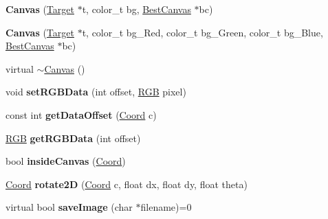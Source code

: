 \begin{DoxyCompactItemize}
\item 
\hypertarget{class_canvas_a53b246273af5f8312e98963ebc5f18c8}{{\bfseries Canvas} (\hyperlink{class_target}{Target} $\ast$t, color\-\_\-t bg, \hyperlink{class_best_canvas}{Best\-Canvas} $\ast$bc)}\label{class_canvas_a53b246273af5f8312e98963ebc5f18c8}

\item 
\hypertarget{class_canvas_ae3d42b2fc30548f6c6bf7d269067e9c7}{{\bfseries Canvas} (\hyperlink{class_target}{Target} $\ast$t, color\-\_\-t bg\-\_\-\-Red, color\-\_\-t bg\-\_\-\-Green, color\-\_\-t bg\-\_\-\-Blue, \hyperlink{class_best_canvas}{Best\-Canvas} $\ast$bc)}\label{class_canvas_ae3d42b2fc30548f6c6bf7d269067e9c7}

\item 
virtual \hyperlink{class_canvas_a237c4549ad2e27c729cd1f71e89f0fd9}{$\sim$\-Canvas} ()
\item 
\hypertarget{class_canvas_aa6fd94baa21ffded183b4bf2375d9516}{void {\bfseries set\-R\-G\-B\-Data} (int offset, \hyperlink{struct_r_g_b}{R\-G\-B} pixel)}\label{class_canvas_aa6fd94baa21ffded183b4bf2375d9516}

\item 
\hypertarget{class_canvas_a9b47997839f63bda394c7385eac6f96e}{const int {\bfseries get\-Data\-Offset} (\hyperlink{struct_coord}{Coord} c)}\label{class_canvas_a9b47997839f63bda394c7385eac6f96e}

\item 
\hypertarget{class_canvas_ab1686ad837e67a4c93d7539d0d3d0151}{\hyperlink{struct_r_g_b}{R\-G\-B} {\bfseries get\-R\-G\-B\-Data} (int offset)}\label{class_canvas_ab1686ad837e67a4c93d7539d0d3d0151}

\item 
\hypertarget{class_canvas_a9e51f90be565cb3e5d683cdf83d67956}{bool {\bfseries inside\-Canvas} (\hyperlink{struct_coord}{Coord})}\label{class_canvas_a9e51f90be565cb3e5d683cdf83d67956}

\item 
\hypertarget{class_canvas_ae397083afa0345eec9c0e212903a6394}{\hyperlink{struct_coord}{Coord} {\bfseries rotate2\-D} (\hyperlink{struct_coord}{Coord} c, float dx, float dy, float theta)}\label{class_canvas_ae397083afa0345eec9c0e212903a6394}

\item 
\hypertarget{class_canvas_abbde1d2cfe76cb174828233e610b62ac}{virtual bool {\bfseries save\-Image} (char $\ast$filename)=0}\label{class_canvas_abbde1d2cfe76cb174828233e610b62ac}


\end{DoxyCompactItemize}
